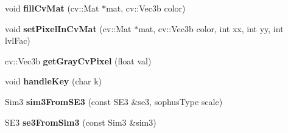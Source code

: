 \begin{DoxyCompactItemize}
\item 
\hypertarget{namespacelsd__slam_a1120ffa076d9ce95a41048a8a2ae4227}{void {\bfseries fill\-Cv\-Mat} (cv\-::\-Mat $\ast$mat, cv\-::\-Vec3b color)}\label{namespacelsd__slam_a1120ffa076d9ce95a41048a8a2ae4227}

\item 
\hypertarget{namespacelsd__slam_a67c5db12802cccb07b65dbaf7eacc8b0}{void {\bfseries set\-Pixel\-In\-Cv\-Mat} (cv\-::\-Mat $\ast$mat, cv\-::\-Vec3b color, int xx, int yy, int lvl\-Fac)}\label{namespacelsd__slam_a67c5db12802cccb07b65dbaf7eacc8b0}

\item 
\hypertarget{namespacelsd__slam_a5f5f06e1592282601033d46603b140c1}{cv\-::\-Vec3b {\bfseries get\-Gray\-Cv\-Pixel} (float val)}\label{namespacelsd__slam_a5f5f06e1592282601033d46603b140c1}

\item 
\hypertarget{namespacelsd__slam_ab7c7b569b42c99eb8312be5a0653df0b}{void {\bfseries handle\-Key} (char k)}\label{namespacelsd__slam_ab7c7b569b42c99eb8312be5a0653df0b}

\item 
\hypertarget{namespacelsd__slam_a65aac68c7cecdc9c125ec8926b27e867}{Sim3 {\bfseries sim3\-From\-S\-E3} (const S\-E3 \&se3, sophus\-Type scale)}\label{namespacelsd__slam_a65aac68c7cecdc9c125ec8926b27e867}

\item 
\hypertarget{namespacelsd__slam_a6ab8d718a8bf6c1c85541b8948bd5248}{S\-E3 {\bfseries se3\-From\-Sim3} (const Sim3 \&sim3)}\label{namespacelsd__slam_a6ab8d718a8bf6c1c85541b8948bd5248}

\end{DoxyCompactItemize}
